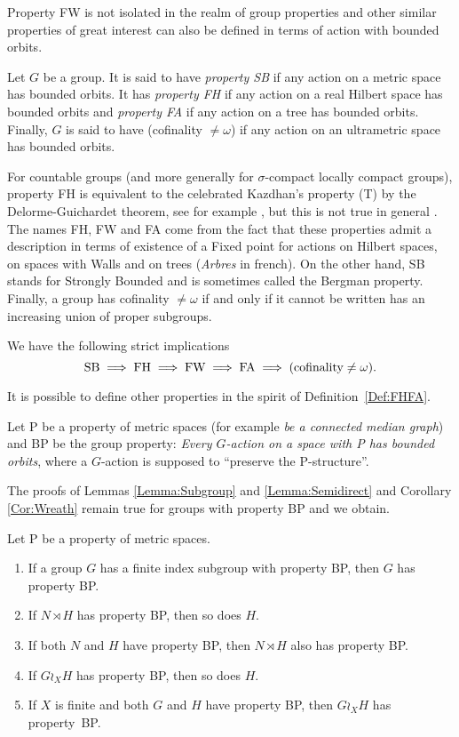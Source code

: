 Property FW is not isolated in the realm of group properties and other similar properties of great interest can also be defined in terms of action with bounded orbits.
\begin{defn}\label{Def:FHFA}
Let $G$ be a group.
It is said to have \emph{property SB} if any action on a metric space has bounded orbits.
It has \emph{property FH} if any action on a real Hilbert space has bounded orbits and \emph{property FA} if any action on a tree has bounded orbits.
Finally, $G$ is said to have (cofinality $\neq\omega$) if any action on an ultrametric space has bounded orbits.
\end{defn}
For countable groups (and more generally for $\sigma$-compact locally compact groups), property FH is equivalent to the celebrated Kazdhan's property (T) by the Delorme-Guichardet theorem, see for example \cite{MR2415834}, but this is not true in general \cite{MR2240370}.
The names FH, FW and FA come from the fact that these properties admit a description in terms of existence of a Fixed point for actions on Hilbert spaces, on spaces with Walls and on trees (\emph{Arbres} in french).
On the other hand, SB stands for Strongly Bounded and is sometimes called the Bergman property.
Finally, a group has cofinality $\neq\omega$ if and only if it cannot be written has an increasing union of proper subgroups.

We have the following strict implications \cite{MR1432323,MR0476875 ,MR3299841,2013arXiv1302.5982C}
\[
\textnormal{SB}\implies \textnormal{FH}\implies \textnormal{FW}\implies \textnormal{FA}\implies(\textnormal{cofinality}\neq\omega).
\]

It is possible to define other properties in the spirit of Definition~\ref{Def:FHFA}.
\begin{defn}
Let P be a property of metric spaces (for example \emph{be a connected median graph}) and BP be the group property: \emph{Every $G$-action on a space with P has bounded orbits}, where a $G$-action is supposed to ``preserve the P-structure''.
\end{defn}
The proofs of Lemmas \ref{Lemma:Subgroup} and \ref{Lemma:Semidirect} and Corollary \ref{Cor:Wreath} remain true for groups with property BP and we obtain.
\begin{prop}\label{Prop:BP}
Let P be a property of metric spaces.
\begin{enumerate}
\item 
If a group $G$ has a finite index subgroup with property BP, then $G$ has property BP.
\item
If $N\rtimes H$ has property BP, then so does $H$.\label{item:2}
\item
If both $N$ and $H$ have property BP, then $N\rtimes H$ also has property BP.
\item
If $G\wr_X H$ has property BP, then so does $H$.
\item
If $X$ is finite and both $G$ and $H$ have property BP, then $G\wr_X H$ has property~BP.
\end{enumerate}
\end{prop}


